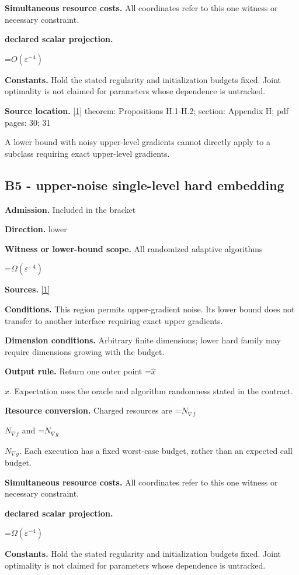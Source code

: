 \documentclass[10pt,a4paper]{article}
\newcommand{\AtlasMath}[1]{\par\begingroup\centering\setbox0=\hbox{$\displaystyle #1$}\ifdim\wd0>1.4\linewidth\typeout{ATLAS WIDE FORMULA: \the\wd0}\fi\ifdim\wd0>\linewidth\resizebox{\linewidth}{!}{\box0}\else\box0\fi\par\endgroup}
\newcommand{\AtlasInlineMath}[1]{\begingroup\setbox0=\hbox{$#1$}\ifdim\wd0>.4\linewidth\endgroup\AtlasMath{#1}\else\endgroup$#1$\fi}
\begin{document}
\textbf{Simultaneous resource costs.} All coordinates refer to this one witness or necessary constraint.

\textbf{declared scalar projection.}

\AtlasMath{O(\varepsilon ^{-4})}
\textbf{Constants.} Hold the stated regularity and initialization budgets fixed. Joint optimality is not claimed for parameters whose dependence is untracked.

\textbf{Source location.} \href{https://arxiv.org/pdf/2610.03638v2}{[1]} theorem: Propositions H.1-H.2; section: Appendix H; pdf pages: 30; 31

A lower bound with noisy upper-level gradients cannot directly apply to a subclass requiring exact upper-level gradients.

\subsection{B5 - upper-noise single-level hard embedding}
\textbf{Admission.} Included in the bracket

\textbf{Direction.} lower

\textbf{Witness or lower-bound scope.} All randomized adaptive algorithms

\AtlasMath{\Omega(\varepsilon^{-4})}
\textbf{Sources.} \href{https://arxiv.org/pdf/2610.03638v2}{[1]}

\textbf{Conditions.} This region permits upper-gradient noise. Its lower bound does not transfer to another interface requiring exact upper gradients.

\textbf{Dimension conditions.} Arbitrary finite dimensions; lower hard family may require dimensions growing with the budget.

\textbf{Output rule.} Return one outer point \AtlasInlineMath{\widehat x}. Expectation uses the oracle and algorithm randomness stated in the contract.

\textbf{Resource conversion.} Charged resources are \AtlasInlineMath{N_{\nabla f}} and \AtlasInlineMath{N_{\nabla g}}. Each execution has a fixed worst-case budget, rather than an expected call budget.

\textbf{Simultaneous resource costs.} All coordinates refer to this one witness or necessary constraint.

\textbf{declared scalar projection.}

\AtlasMath{\Omega (\varepsilon ^{-4})}
\textbf{Constants.} Hold the stated regularity and initialization budgets fixed. Joint optimality is not claimed for parameters whose dependence is untracked.
\end{document}
